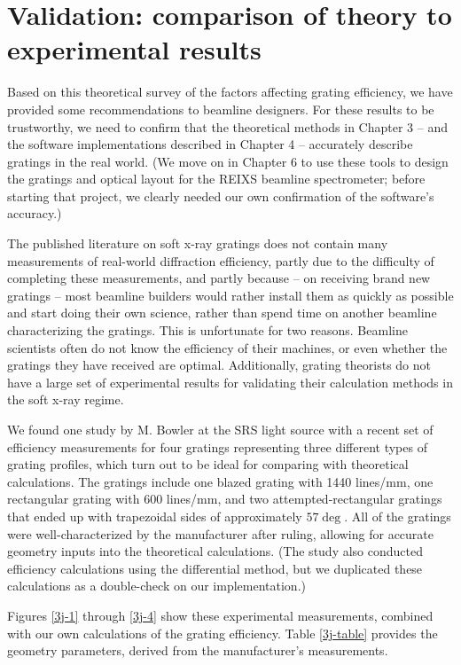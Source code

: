 \section{Validation: comparison of theory to experimental results}
Based on this theoretical survey of the factors affecting grating efficiency, we have provided some recommendations to beamline designers.  For these results to be trustworthy, we need to confirm that the theoretical methods in Chapter 3 -- and the software implementations described in Chapter 4 -- accurately describe gratings in the real world.  (We move on in Chapter 6 to use these tools to design the gratings and optical layout for the REIXS beamline spectrometer; before starting that project, we clearly needed our own confirmation of the software's accuracy.)

The published literature on soft x-ray gratings does not contain many measurements of real-world diffraction efficiency, partly due to the difficulty of completing these measurements, and partly because -- on receiving brand new gratings -- most beamline builders would rather install them as quickly as possible and start doing their own science, rather than spend time on another beamline characterizing the gratings.  This is unfortunate for two reasons.  Beamline scientists often do not know the efficiency of their machines, or even whether the gratings they have received are optimal. Additionally, grating theorists do not have a large set of experimental results for validating their calculation methods in the soft x-ray regime.

 We found one study by M. Bowler at the SRS light source \cite{Bow01} with a recent set of efficiency measurements for four gratings representing three different types of grating profiles, which turn out to be ideal for comparing with theoretical calculations.  The gratings include one blazed grating with 1440 lines/mm, one rectangular grating with 600 lines/mm, and two attempted-rectangular gratings that ended up with trapezoidal sides of approximately $57\deg$.  All of the gratings were well-characterized by the manufacturer after ruling, allowing for accurate geometry inputs into the theoretical calculations.  (The study also conducted efficiency calculations using the differential method, but we duplicated these calculations as a double-check on our implementation.)

Figures \ref{3j-1} through \ref{3j-4} show these experimental measurements, combined with our own calculations of the grating efficiency.  Table \ref{3j-table} provides the geometry parameters, derived from the manufacturer's measurements.

